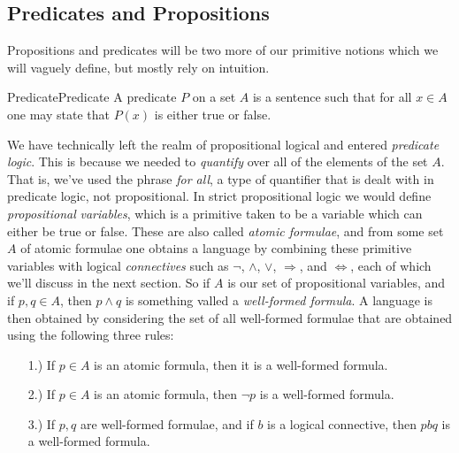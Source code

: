     \subsection{Predicates and Propositions}
        Propositions and predicates will be two more of our primitive notions
        which we will vaguely define, but mostly rely on intuition.
        \begin{fdefinition}{Predicate}{Predicate}
            A \gls{predicate} $P$ on a \gls{set} $A$ is a sentence such that for
            all $x\in{A}$ one may state that $P(x)$ is either true or false.%
        \end{fdefinition}
        We have technically left the realm of propositional logical and entered
        \textit{predicate logic}.
        This is because we needed to \textit{quantify} over all of the elements
        of the set $A$. That is, we've used the phrase \textit{for all}, a type
        of quantifier that is dealt with in predicate logic, not propositional.
        In strict propositional logic we would define \textit{propositional}
        \textit{variables}, which is a primitive
        taken to be a variable which can either be true or false. These are also
        called \textit{atomic formulae}, and from some set
        $A$ of atomic formulae one obtains a language by combining these
        primitive variables with logical \textit{connectives} such as $\neg$,
        $\land$, $\lor$, $\Rightarrow$, and $\Leftrightarrow$, each of which
        we'll discuss in the next section. So if $A$ is our set of propositional
        variables, and if $p,q\in{A}$, then $p\land{q}$ is something valled a
        \textit{well-formed formula}. A language is then obtained by considering
        the set of all well-formed formulae that are obtained using the
        following three rules:
        \begin{itemize}
            \item[1.)] If $p\in{A}$ is an atomic formula, then it is a
                       well-formed formula.
            \item[2.)] If $p\in{A}$ is an atomic formula, then $\neg{p}$ is a
                       well-formed formula. 
            \item[3.)] If $p,q$ are well-formed formulae, and if $b$ is a
                       logical connective, then $pbq$ is a well-formed formula.  
        \end{itemize}
